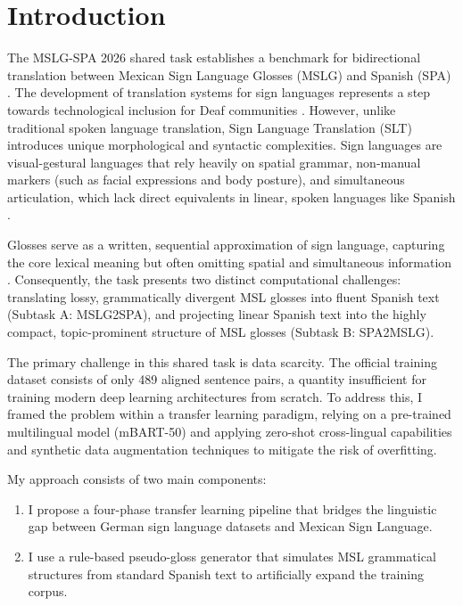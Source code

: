 \documentclass[11pt,a4paper,english]{ceurart}
\begin{document}
\maketitle

\section{Introduction}

The MSLG-SPA 2026 shared task establishes a benchmark for bidirectional translation between Mexican Sign Language Glosses (MSLG) and Spanish (SPA) \cite{rodriguez2026overview, iberlef2026overview}. The development of translation systems for sign languages represents a step towards technological inclusion for Deaf communities \cite{bragg2019sign}. However, unlike traditional spoken language translation, Sign Language Translation (SLT) introduces unique morphological and syntactic complexities. Sign languages are visual-gestural languages that rely heavily on spatial grammar, non-manual markers (such as facial expressions and body posture), and simultaneous articulation, which lack direct equivalents in linear, spoken languages like Spanish \cite{yin2021including}.

Glosses serve as a written, sequential approximation of sign language, capturing the core lexical meaning but often omitting spatial and simultaneous information \cite{yin2021including}. Consequently, the task presents two distinct computational challenges: translating lossy, grammatically divergent MSL glosses into fluent Spanish text (Subtask A: MSLG2SPA), and projecting linear Spanish text into the highly compact, topic-prominent structure of MSL glosses (Subtask B: SPA2MSLG).

The primary challenge in this shared task is data scarcity. The official training dataset consists of only 489 aligned sentence pairs, a quantity insufficient for training modern deep learning architectures from scratch. To address this, I framed the problem within a transfer learning paradigm, relying on a pre-trained multilingual model (mBART-50) and applying zero-shot cross-lingual capabilities and synthetic data augmentation techniques to mitigate the risk of overfitting.

\newpage
My approach consists of two main components:
\begin{enumerate}
    \item I propose a four-phase transfer learning pipeline that bridges the linguistic gap between German sign language datasets and Mexican Sign Language.
    \item I use a rule-based pseudo-gloss generator that simulates MSL grammatical structures from standard Spanish text to artificially expand the training corpus.
\end{enumerate}
\end{document}
